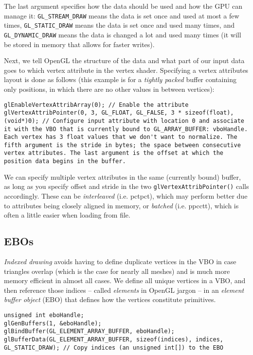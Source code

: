 \documentclass[8pt, table, xcdraw]{article}%
\begin{document}
The last argument specifies how the data should be used and how the GPU can manage it: \lstinline{GL_STREAM_DRAW} means the data is set once and used at most a few times, \lstinline{GL_STATIC_DRAW} means the data is set once and used many times, and \lstinline{GL_DYNAMIC_DRAW} means the data is changed a lot and used many times (it will be stored in memory that allows for faster writes).

Next, we tell OpenGL the structure of the data and what part of our input data goes to which vertex attribute in the vertex shader. Specifying a vertex attributes layout is done as follows (this example is for a \emph{tightly packed} buffer containing only positions, in which there are no other values in between vertices):

\begin{lstlisting}
glEnableVertexAttribArray(0); // Enable the attribute
glVertexAttribPointer(0, 3, GL_FLOAT, GL_FALSE, 3 * sizeof(float), (void*)0); // Configure input attribute with location 0 and associate it with the VBO that is currently bound to GL_ARRAY_BUFFER: vboHandle. Each vertex has 3 float values that we don't want to normalize. The fifth argument is the stride in bytes; the space between consecutive vertex attributes. The last argument is the offset at which the position data begins in the buffer.
\end{lstlisting}

We can specify multiple vertex attributes in the same (currently bound) buffer, as long as you specify offset and stride in the two \lstinline{glVertexAttribPointer()} calls accordingly. These can be \emph{interleaved} (i.e. pctpct), which may perform better due to attributes being closely aligned in memory, or \emph{batched} (i.e. ppcctt), which is often a little easier when loading from file.

\subsection{EBOs}

\emph{Indexed drawing} avoids having to define duplicate vertices in the VBO in case triangles overlap (which is the case for nearly all meshes) and is much more memory efficient in almost all cases. We define all unique vertices in a VBO, and then reference those indices -- called \emph{elements} in OpenGL jargon -- in an \emph{element buffer object} (EBO) that defines how the vertices constitute primitives.

\begin{lstlisting}
unsigned int eboHandle;
glGenBuffers(1, &eboHandle);
glBindBuffer(GL_ELEMENT_ARRAY_BUFFER, eboHandle);
glBufferData(GL_ELEMENT_ARRAY_BUFFER, sizeof(indices), indices, GL_STATIC_DRAW); // Copy indices (an unsigned int[]) to the EBO
\end{lstlisting}
\end{document}
